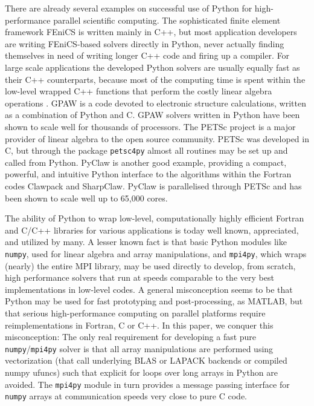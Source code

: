 \documentclass[final,1p,times]{elsarticle}
\begin{document}
There are already several examples on successful use of Python for
high-performance parallel scientific computing. The sophisticated
finite element framework FEniCS \cite{fenics} is written mainly in
C++, but most application developers are writing FEniCS-based solvers
directly in Python, never actually finding themselves in need of
writing longer C++ code and firing up a compiler. For large scale
applications the developed Python solvers are usually equally fast as
their C++ counterparts, because most of the computing time is
spent within the low-level wrapped C++ functions that perform the
costly linear algebra operations \cite{Mortensen2015}.
GPAW \cite{gpaw05} is a code devoted
to electronic structure calculations, written as a combination of
Python and C. GPAW solvers written in Python have been shown to scale
well for thousands of processors.  The PETSc project \cite{petsc-web-page} is a major
provider of linear algebra to the open source community. PETSc was
developed in C, but through the package \texttt{petsc4py} almost all
routines may be set up and called from Python. PyClaw \cite{ketcheson2012}
is another good example, providing a compact, powerful, and intuitive
Python interface to the algorithms within the Fortran codes Clawpack
and SharpClaw. PyClaw is parallelised through PETSc and has been shown
to scale well up to 65,000 cores.

The ability of Python to wrap low-level, computationally highly efficient Fortran and C/C++ libraries for various applications is today well known, appreciated, and utilized by many. A lesser known fact is that basic Python modules like \texttt{numpy}, used for linear algebra and array manipulations, and \texttt{mpi4py}, which wraps (nearly) the entire MPI library, may be used directly to develop, from scratch, high performance solvers that run at speeds comparable to the very best implementations in low-level codes. A general misconception seems to be that Python may be used for fast prototyping and post-processing, as MATLAB, but that serious high-performance computing on parallel platforms require reimplementations in Fortran, C or C++. In this paper, we conquer this misconception: The only real requirement for developing a fast pure \texttt{numpy}/\texttt{mpi4py} solver is that all array manipulations are performed using vectorization (that call underlying BLAS or LAPACK backends or compiled numpy ufuncs) such that explicit for loops over long arrays in Python are avoided. The \texttt{mpi4py} module in turn provides a message passing interface for \texttt{numpy} arrays at communication speeds very close to pure C code.
\end{document}
